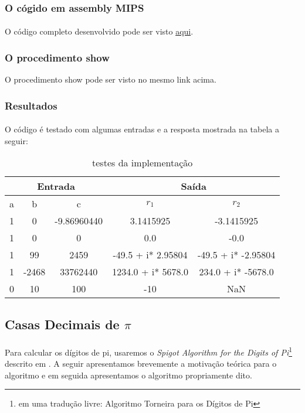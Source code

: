 \subsubsection{O cógido em assembly MIPS}
\paragraph{}O código completo desenvolvido pode ser visto
\href{https://github.com/JuarezASF/LaTeX/blob/master/UnB2014/OAC/exp2/code/raizes2grau.asm}{aqui}.

\subsubsection{O procedimento show}
O procedimento show pode ser visto no mesmo link acima.

\subsubsection{Resultados}
\paragraph{}O código é testado com algumas entradas e a resposta mostrada na
tabela a seguir:
\begin{table}[H]
\centering
\begin{tabular}{|c|c|c|c|c|} \hline
	\multicolumn{3}{|c|}{ Entrada} & \multicolumn{2}{|c|}{ Saída} \\ \hline
	a & b & c & $r_1$ & $r_2$ \\ \hline
	1 & 0 &  -9.86960440 &3.1415925 & -3.1415925 \\ \hline
	1 & 0 &  0           & 0.0     &-0.0 \\ \hline
	1 & 99&  2459        &-49.5 + i* 2.95804  &-49.5 + i* -2.95804 \\ \hline
	1 & -2468 & 33762440  &1234.0 + i* 5678.0 & 234.0 + i* -5678.0 \\ \hline
	0 & 10 & 100  &-10    & NaN \\ \hline
\end{tabular}
\caption{testes da implementação}
\end{table}
 
\subsection{Casas Decimais de $\pi$}
\paragraph{}Para calcular os dígitos de pi, usaremos o \emph{Spigot Algorithm
for the Digits of Pi}\footnote{em uma tradução livre: Algoritmo Torneira para os Dígitos
de Pi} descrito em \cite{SpigotPi}. A seguir apresentamos brevemente a
motivação teórica para o algoritmo e em seguida apresentamos o algoritmo
propriamente dito.


